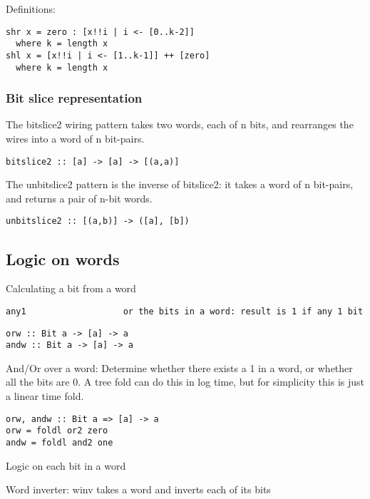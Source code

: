 \documentclass[11pt]{article}
\begin{document}
Definitions:

\begin{verbatim}
shr x = zero : [x!!i | i <- [0..k-2]]
  where k = length x
shl x = [x!!i | i <- [1..k-1]] ++ [zero]
  where k = length x
\end{verbatim}

\subsubsection{Bit slice representation}
\label{sec:orgc90f3f9}

The bitslice2 wiring pattern takes two words, each of n bits, and
rearranges the wires into a word of n bit-pairs.

\begin{verbatim}
bitslice2 :: [a] -> [a] -> [(a,a)]
\end{verbatim}

The unbitslice2 pattern is the inverse of bitslice2: it takes a word
of n bit-pairs, and returns a pair of n-bit words.

\begin{verbatim}
unbitslice2 :: [(a,b)] -> ([a], [b])
\end{verbatim}

\subsection{Logic on words}
\label{sec:org98d8eee}


Calculating a bit from a word


\begin{verbatim}
any1                   or the bits in a word: result is 1 if any 1 bit
\end{verbatim}


\begin{verbatim}
orw :: Bit a -> [a] -> a
andw :: Bit a -> [a] -> a
\end{verbatim}


And/Or over a word: Determine whether there exists a 1 in a word,
or whether all the bits are 0.  A tree fold can do this in log
time, but for simplicity this is just a linear time fold.


\begin{verbatim}
orw, andw :: Bit a => [a] -> a
orw = foldl or2 zero
andw = foldl and2 one
\end{verbatim}


Logic on each bit in a word

Word inverter: winv takes a word and inverts each of its bits
\end{document}
